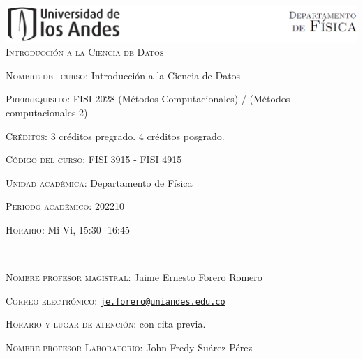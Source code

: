\documentclass[letterpaper,10pt,onecolumn]{article}
\begin{document}
\begin{center}

\includegraphics[width=490pt]{header.png}\\[0.5cm]

\textsc{\LARGE Introducci\'on a la Ciencia de Datos}\\[0.1cm]

\end{center}

\large \noindent\textsc{Nombre del curso:}  Introducci\'on a la Ciencia de Datos%
  
\noindent\textsc{Prerrequisito:} FISI 2028 (M\'etodos Computacionales) / (M\'etodos computacionales 2)%

\noindent\textsc{Cr\'editos:} 3 cr\'editos pregrado. 4 cr\'editos posgrado. %

\noindent\textsc{C\'odigo del curso:} FISI 3915 - FISI 4915 %

\noindent\textsc{Unidad acad\'emica:} Departamento de F\'isica

\noindent\textsc{Periodo acad\'emico:} 202210 %

\noindent\textsc{Horario:} Mi-Vi, 15:30 -16:45



\noindent\rule{\textwidth}{1pt}\\[-0.3cm]

\normalsize \noindent\textsc{Nombre profesor magistral:}
Jaime Ernesto Forero Romero%

\noindent\textsc{Correo electr\'onico:}
\href{mailto:je.forero@uniandes.edu.co}{\nolinkurl{je.forero@uniandes.edu.co}}

\noindent\textsc{Horario y lugar de atenci\'on:}  con cita previa.

\normalsize \noindent\textsc{Nombre profesor Laboratorio:}
John Fredy Su\'arez P\'erez  %
\end{document}
